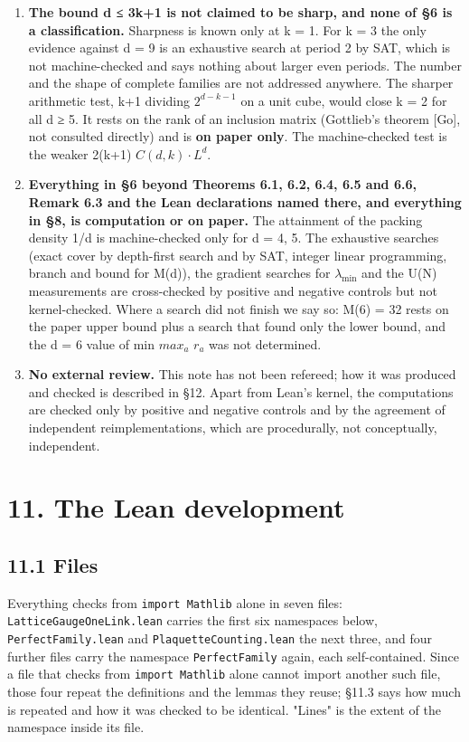 \documentclass[11pt,a4paper]{article}
\theoremstyle{named}
\begin{document}
\begin{enumerate}
\item[6.] \textbf{The bound d ≤ 3k+1 is not claimed to be sharp, and none of §6 is a classification.} Sharpness is known only at k = 1. For k = 3 the only evidence against d = 9 is an exhaustive search at period 2 by SAT, which is not machine-checked and says nothing about larger even periods. The number and the shape of complete families are not addressed anywhere. The sharper arithmetic test, k+1 dividing $2^{d−k−1}$ on a unit cube, would close k = 2 for all d ≥ 5. It rests on the rank of an inclusion matrix (Gottlieb's theorem [Go], not consulted directly) and is \textbf{on paper only}. The machine-checked test is the weaker 2(k+1) \textbar{} $C(d,k)·L^d$.
\item[7.] \textbf{Everything in §6 beyond Theorems 6.1, 6.2, 6.4, 6.5 and 6.6, Remark 6.3 and the Lean declarations named there, and everything in §8, is computation or on paper.} The attainment of the packing density 1/d is machine-checked only for d = 4, 5. The exhaustive searches (exact cover by depth-first search and by SAT, integer linear programming, branch and bound for M(d)), the gradient searches for $λ_{\min}$ and the U(N) measurements are cross-checked by positive and negative controls but not kernel-checked. Where a search did not finish we say so: M(6) = 32 rests on the paper upper bound plus a search that found only the lower bound, and the d = 6 value of min $max_a$ $r_a$ was not determined.
\item[8.] \textbf{No external review.} This note has not been refereed; how it was produced and checked is described in §12. Apart from Lean's kernel, the computations are checked only by positive and negative controls and by the agreement of independent reimplementations, which are procedurally, not conceptually, independent.
\end{enumerate}

\section*{11. The Lean development}

\subsection*{11.1 Files}
Everything checks from \texttt{import\ \allowbreak{}Mathlib} alone in seven files: \texttt{LatticeGaugeOneLink.\allowbreak{}lean} carries the first six namespaces below, \texttt{PerfectFamily.\allowbreak{}lean} and \texttt{PlaquetteCounting.\allowbreak{}lean} the next three, and four further files carry the namespace \texttt{PerfectFamily} again, each self-contained. Since a file that checks from \texttt{import\ \allowbreak{}Mathlib} alone cannot import another such file, those four repeat the definitions and the lemmas they reuse; §11.3 says how much is repeated and how it was checked to be identical. "Lines" is the extent of the namespace inside its file.
\end{document}
